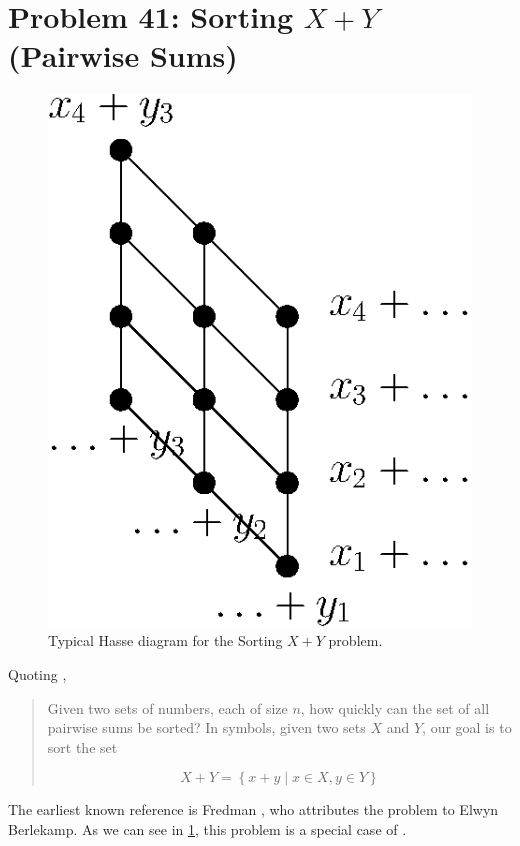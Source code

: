 

\section{Problem 41: Sorting $X + Y$ (Pairwise Sums)}

\begin{figure}
	\centering
	\includegraphics[height=0.2\textheight]{fig/open/x+y}
	\caption{Typical Hasse diagram for the Sorting $X + Y$ problem.}
	\label{fig:open:xy}
\end{figure}

Quoting \cite{orourke:2012:sortxy},

\begin{quotation}
Given two sets of numbers, each of size $n$, how quickly can the set of all
pairwise sums be sorted? In symbols, given two sets $X$ and $Y$, our goal is to
sort the set

$$ X + Y = \left\{{x + y \mid x \in X, y \in Y }\right\} $$

\end{quotation}

The earliest known reference is Fredman \cite{fredman1976good}, who attributes
the problem to Elwyn Berlekamp. As we can see in \ref{fig:open:xy}, this
problem is a special case of .

